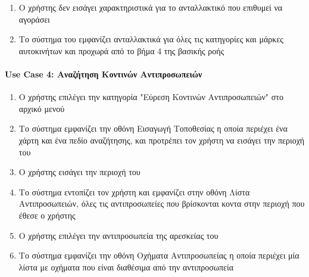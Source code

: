 \documentclass{../ol-softwaremanual}
\begin{document}
	\begin{enumerate}
		\item Ο χρήστης δεν εισάγει χαρακτηριστικά για το ανταλλακτικό που επιθυμεί να αγοράσει
		\item Το σύστημα του εμφανίζει ανταλλακτικά για όλες τις κατηγορίες και μάρκες αυτοκινήτων και προχωρά από το βήμα 4 της βασικής ροής
	\end{enumerate}
	
	\paragraph{\en Use Case 4: \gr Αναζήτηση Κοντινών Αντιπροσωπειών}	
	
	\begin{enumerate}
		\item Ο χρήστης επιλέγει την κατηγορία \en"\gr Εύρεση Κοντινών Αντιπροσωπειών\en" \gr στο αρχικό μενού
		\item Το σύστημα εμφανίζει την οθόνη Εισαγωγή Τοποθεσίας η οποία περιέχει ένα χάρτη και ένα πεδίο αναζήτησης,  και προτρέπει τον χρήστη να εισάγει την περιοχή του
		\item Ο χρήστης εισάγει την περιοχή του  
		\item Το σύστημα εντοπίζει τον χρήστη και εμφανίζει στην οθόνη Λίστα Αντιπροσωπειών, όλες τις αντιπροσωπείες που βρίσκονται κοντα στην περιοχή που έθεσε ο χρήστης
		\item Ο χρήστης επιλέγει την αντιπροσωπεία της αρεσκείας του
		\item Το σύστημα εμφανίζει την οθόνη Οχήματα Αντιπροσωπείας η οποία περιέχει μία λίστα με οχήματα που είναι διαθέσιμα από την αντιπροσωπεία     	
	\end{enumerate}
	
\end{document}
